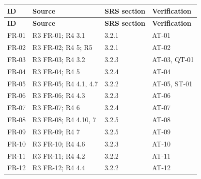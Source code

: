 \documentclass[11pt,letterpaper]{article}
\begin{document}
\begin{longtable}{|P{\arrayrulewidth\relax}|P{\arrayrulewidth\relax}|P{\arrayrulewidth\relax}|P{\arrayrulewidth\relax}|}

\hline{}

\textbf{ID} & \textbf{Source} & \textbf{SRS section} & \textbf{Verification} \\ \hline

\endfirsthead

\hline{}

\textbf{ID} & \textbf{Source} & \textbf{SRS section} & \textbf{Verification} \\ \hline

\endhead

\hline\endfoot

\hline\endlastfoot

FR-01 & R3 FR-01; R4 3.1 & 3.2.1 & AT-01 \\ \hline

FR-02 & R3 FR-02; R4 5; R5 & 3.2.1 & AT-02 \\ \hline

FR-03 & R3 FR-03; R4 3.2 & 3.2.3 & AT-03, QT-01 \\ \hline

FR-04 & R3 FR-04; R4 5 & 3.2.4 & AT-04 \\ \hline

FR-05 & R3 FR-05; R4 4.1, 4.7 & 3.2.2 & AT-05, ST-01 \\ \hline

FR-06 & R3 FR-06; R4 4.3 & 3.2.3 & AT-06 \\ \hline

FR-07 & R3 FR-07; R4 6 & 3.2.4 & AT-07 \\ \hline

FR-08 & R3 FR-08; R4 4.10, 7 & 3.2.5 & AT-08 \\ \hline

FR-09 & R3 FR-09; R4 7 & 3.2.5 & AT-09 \\ \hline

FR-10 & R3 FR-10; R4 4.6 & 3.2.3 & AT-10 \\ \hline

FR-11 & R3 FR-11; R4 4.2 & 3.2.2 & AT-11 \\ \hline

FR-12 & R3 FR-12; R4 4.4 & 3.2.2 & AT-12 \\ \hline


\end{longtable}
\end{document}
